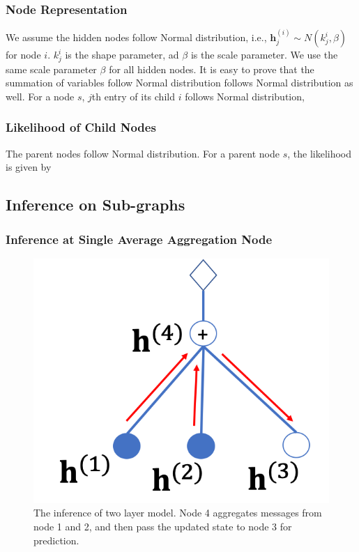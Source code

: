 \documentclass[conference]{IEEEtran}
\begin{document}
\subsubsection{Node Representation}
We assume the hidden nodes follow Normal distribution, i.e., $\mathbf{h}_j^{(i)} \sim N(k_j^{i}, \beta)$ for node $i$. $k_j^{i}$ is the shape parameter, ad $\beta$ is the scale parameter. We use the same scale parameter $\beta$ for all hidden nodes. It is easy to prove that the summation of variables follow Normal distribution follows Normal distribution as well. For a node $s$,  $j$th entry of its child $i$ follows Normal distribution,  

\subsubsection{Likelihood of Child Nodes}
The parent nodes follow Normal distribution. For a parent node $s$, the likelihood is given by 



\subsection{Inference on Sub-graphs }
\subsubsection{Inference at Single Average Aggregation Node}

\begin{figure}[!htbp] %
\begin{center}
 \includegraphics[width=0.43\linewidth]{fig/two_layer_infer.png}
\end{center}
   \caption{The inference of two layer model. Node 4 aggregates messages from node 1 and 2, and then pass  the updated state to node 3 for prediction.}
\label{fig:two_layer_infer}
\end{figure}
\end{document}
